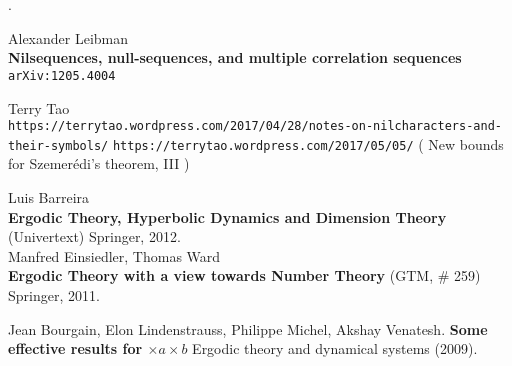 \documentclass[12pt]{article}
\begin{document}
\noindent .

\vfill

\begin{thebibliography}{}

\item Alexander Leibman \\ \textbf{Nilsequences, null-sequences, and multiple correlation sequences} \texttt{ arXiv:1205.4004} 
\item 
Terry Tao \\
\texttt{https://terrytao.wordpress.com/2017/04/28/notes-on-nilcharacters-and-their-symbols/}
\texttt{https://terrytao.wordpress.com/2017/05/05/} ( New bounds for Szemer\'{e}di's theorem, III )

\item Luis Barreira \\ \textbf{Ergodic Theory, Hyperbolic
Dynamics and Dimension
Theory} (Univertext) Springer, 2012. \\ 
Manfred Einsiedler, Thomas Ward \\ \textbf{Ergodic Theory
with a view towards Number Theory} (GTM, \# 259) Springer, 2011.

\item Jean Bourgain, Elon Lindenstrauss, Philippe Michel, Akshay Venatesh. \textbf{Some effective results for $\times a \times b$} Ergodic theory and dynamical systems (2009).

\end{thebibliography}
\end{document}
